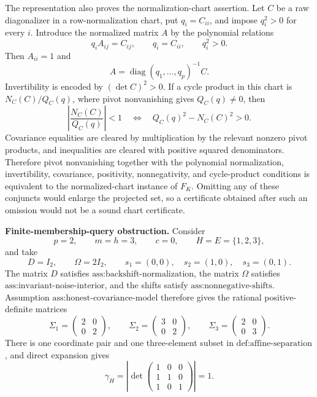 The representation also proves the normalization-chart assertion.  Let \(C\) be a raw diagonalizer in a row-normalization chart, put \(q_i=C_{ii}\), and impose \(q_i^2>0\) for every \(i\).  Introduce the normalized matrix \(A\) by the polynomial relations
\[
 q_iA_{ij}=C_{ij},\qquad q_i=C_{ii},\qquad q_i^2>0.
\]
Then \(A_{ii}=1\) and
\[
 A=\operatorname{diag}(q_1,\ldots,q_p)^{-1}C.
\]
Invertibility is encoded by \((\det C)^2>0\).  If a cycle product in this chart is \(N_C(C)/Q_C(q)\), where pivot nonvanishing gives \(Q_C(q)\neq0\), then
\[
 \left|\frac{N_C(C)}{Q_C(q)}\right|<1
 \quad\Longleftrightarrow\quad
 Q_C(q)^2-N_C(C)^2>0.
\]
Covariance equalities are cleared by multiplication by the relevant nonzero pivot products, and inequalities are cleared with positive squared denominators.  Therefore pivot nonvanishing together with the polynomial normalization, invertibility, covariance, positivity, nonnegativity, and cycle-product conditions is equivalent to the normalized-chart instance of \(F_K\).  Omitting any of these conjuncts would enlarge the projected set, so a certificate obtained after such an omission would not be a sound chart certificate.

\textbf{Finite-membership-query obstruction.}
Consider
\[
 p=2,\qquad m=h=3,\qquad c=0,\qquad H=E=\{1,2,3\},
\]
and take
\[
 D=I_2,\qquad \Omega=2I_2,\qquad
 s_1=(0,0),\quad s_2=(1,0),\quad s_3=(0,1).
\]
The matrix \(D\) satisfies \(\text{ass:backshift-normalization}\), the matrix \(\Omega\) satisfies \(\text{ass:invariant-noise-interior}\), and the shifts satisfy \(\text{ass:nonnegative-shifts}\).  Assumption \(\text{ass:honest-covariance-model}\) therefore gives the rational positive-definite matrices
\[
 \Sigma_1=\begin{pmatrix}2&0\\0&2\end{pmatrix},\qquad
 \Sigma_2=\begin{pmatrix}3&0\\0&2\end{pmatrix},\qquad
 \Sigma_3=\begin{pmatrix}2&0\\0&3\end{pmatrix}.
\]
There is one coordinate pair and one three-element subset in \(\text{def:affine-separation}\), and direct expansion gives
\[
 \gamma_H=
 \left|\det\begin{pmatrix}1&0&0\\1&1&0\\1&0&1\end{pmatrix}\right|=1.
\]

